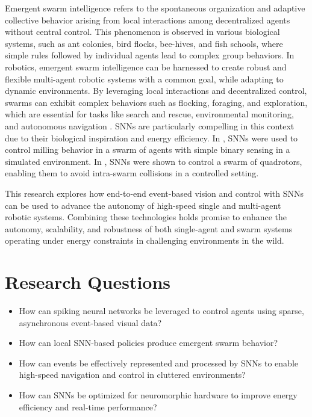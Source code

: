 \documentclass{article}
\begin{document}
Emergent swarm intelligence refers to the spontaneous organization and adaptive collective behavior arising from local interactions among decentralized agents without central control. This phenomenon is observed in various biological systems, such as ant colonies, bird flocks, bee-hives, and fish schools, where simple rules followed by individual agents lead to complex group behaviors. In robotics, emergent swarm intelligence can be harnessed to create robust and flexible multi-agent robotic systems with a common goal, while adapting to dynamic environments. By leveraging local interactions and decentralized control, swarms can exhibit complex behaviors such as flocking, foraging, and exploration, which are essential for tasks like search and rescue, environmental monitoring, and autonomous navigation \cite{debieSwarmRoboticsSurvey2023}. SNNs are particularly compelling in this context due to their biological inspiration and energy efficiency. In \cite{zhuSpikingNeuralNetworks2024}, SNNs were used to control milling behavior in a swarm of agents with simple binary sensing in a simulated environment. In \cite{zhaoNatureinspiredSelforganizingCollision2022}, SNNs were shown to control a swarm of quadrotors, enabling them to avoid intra-swarm collisions in a controlled setting. 

This research explores how end-to-end event-based vision and control with SNNs can be used to advance the autonomy of high-speed single and multi-agent robotic systems. Combining these technologies holds promise to enhance the autonomy, scalability, and robustness of both single-agent and swarm systems operating under energy constraints in challenging environments in the wild.

\section{Research Questions}
\begin{itemize}
    \item How can spiking neural networks be leveraged to control agents using sparse, asynchronous event-based visual data?
    \item How can local SNN-based policies produce emergent swarm behavior?
    \item How can events be effectively represented and processed by SNNs to enable high-speed navigation and control in cluttered environments?
    \item How can SNNs be optimized for neuromorphic hardware to improve energy efficiency and real-time performance?
\end{itemize}
\end{document}
